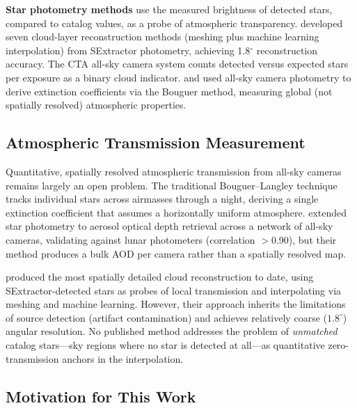 \textbf{Star photometry methods} use the measured brightness of detected
stars, compared to catalog values, as a probe of atmospheric transparency.
\citet{zhi_cloud_2024} developed seven cloud-layer reconstruction methods
(meshing plus machine learning interpolation) from SExtractor photometry,
achieving 1.8$^\circ$ reconstruction accuracy.  The CTA all-sky camera
system counts detected versus expected stars per exposure as a binary cloud
indicator.  \citet{bortolotto_extinction_2014} and
\citet{anghel_photometric_2019} used all-sky camera photometry to derive
extinction coefficients via the Bouguer method, measuring global (not
spatially resolved) atmospheric properties.

\subsection{Atmospheric Transmission Measurement}
\label{sec:litreview:transmission}

Quantitative, spatially resolved atmospheric transmission from all-sky
cameras remains largely an open problem.  The traditional Bouguer--Langley
technique \citep{bortolotto_extinction_2014, anghel_photometric_2019}
tracks individual stars across airmasses through a night, deriving a single
extinction coefficient that assumes a horizontally uniform atmosphere.
\citet{roman_aod_2025} extended star photometry to aerosol optical depth
retrieval across a network of all-sky cameras, validating against lunar
photometers (correlation $>$0.90), but their method produces a bulk AOD per
camera rather than a spatially resolved map.

\citet{zhi_cloud_2024} produced the most spatially detailed cloud
reconstruction to date, using SExtractor-detected stars as probes of local
transmission and interpolating via meshing and machine learning.  However,
their approach inherits the limitations of source detection (artifact
contamination) and achieves relatively coarse ($1.8^\circ$) angular
resolution.  No published method addresses the problem of \emph{unmatched}
catalog stars---sky regions where no star is detected at all---as
quantitative zero-transmission anchors in the interpolation.

\subsection{Motivation for This Work}
\label{sec:litreview:motivation}


